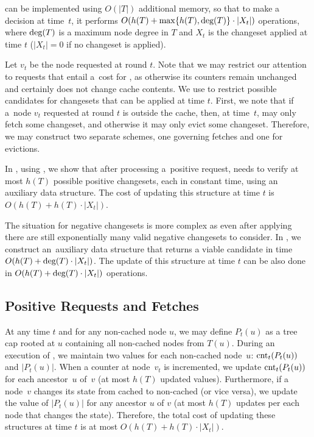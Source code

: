 \begin{theorem}
\ALGTC can be implemented using $O(|T|)$ additional memory, so that to make a
decision at time~$t$, it performs $O(h(T) + \max \{ h(T), \textrm{deg}(T) \} \cdot |X_t|)$ operations,
where $\textrm{deg}(T)$ is a maximum node degree in $T$ and 
$X_t$ is the changeset applied at time $t$ ($|X_t| = 0$ if no changeset is
applied). 
\end{theorem}


Let $v_t$ be the node requested at round $t$. Note that we may restrict our
attention to requests that entail a~cost for \ALGTC, as otherwise its counters
remain unchanged and certainly \ALGTC does not change cache contents. We use
 to restrict possible candidates
for changesets that can be applied at time $t$. First, we note that if a~node
$v_t$ requested at round $t$ is outside the cache, then, at time~$t$, \ALGTC may
only fetch some changeset, and otherwise it may only evict some changeset.
Therefore, we may construct two separate schemes, one governing fetches and
one for evictions.

In , using 
, we show that after processing 
a~positive request, \ALGTC needs to verify at most $h(T)$ possible positive changesets,
each in constant time, using an auxiliary data
structure. The cost of updating this structure at time $t$ is 
$O(h(T) + h(T) \cdot |X_t|)$.

The situation for negative changesets is more complex as even after applying
 there are still exponentially
many valid negative changesets to consider. In
, we construct an~auxiliary
data structure that returns a viable candidate in time $O(h(T) + \textrm{deg}(T)
\cdot |X_t|)$. The update of this structure at time $t$ can be also done in
$O(h(T) + \textrm{deg}(T) \cdot |X_t|)$ operations.

\subsection{Positive Requests and Fetches}
\label{sec:implementing_positive_counters}

At any time $t$ and for any non-cached node $u$, we may define $P_t(u)$ as a
tree cap rooted at $u$ containing all non-cached nodes from $T(u)$. During an
execution of \ALGTC, we maintain two values for each non-cached node~$u$:
$\textrm{cnt}_t(P_t(u))$ and $|P_t(u)|$. When a counter at node~$v_t$ is incremented, we
update $\textrm{cnt}_t(P_t(u))$ for each ancestor~$u$ of~$v$ (at most $h(T)$ updated
values). Furthermore, if a node~$v$ changes its state from cached to
non-cached (or vice versa), we update the value of $|P_t(u)|$ for any ancestor $u$
of $v$ (at most $h(T)$ updates per each node that changes the
state). Therefore, the total cost of updating these structures at time $t$ is
at most $O(h(T) + h(T) \cdot |X_t|)$.

